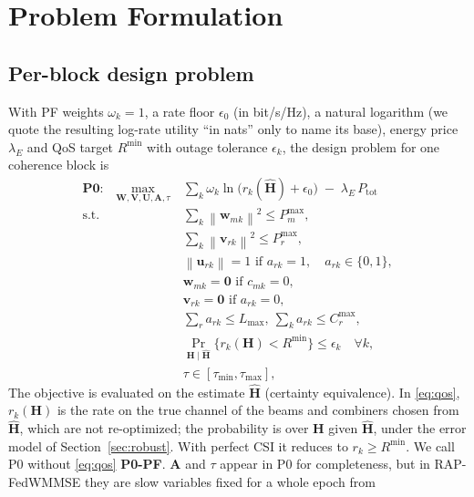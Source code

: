 \documentclass[conference]{IEEEtran}
\newcommand{\norm}[1]{\left\lVert #1 \right\rVert}
\begin{document}
\section{Problem Formulation}\label{sec:problem}
\subsection{Per-block design problem}
With PF weights $\omega_k=1$, a rate floor $\epsilon_0$ (in bit/s/Hz), a
natural logarithm (we quote the resulting log-rate utility ``in nats'' only
to name its base), energy price $\lambda_E$ and QoS target $R^{\min}$ with
outage tolerance $\epsilon_k$, the design problem for one coherence block is
\begin{subequations}\label{eq:P0}
\begin{align}
\textbf{P0:}\quad
\max_{\mathbf{W},\mathbf{V},\mathbf{U},\mathbf{A},\tau}\
& \sum_{k} \omega_k \ln\bigl(r_k(\hat{\mathbf{H}}) + \epsilon_0\bigr)
  \;-\; \lambda_E\, P_{\mathrm{tot}} \label{eq:obj}\\
\text{s.t.}\quad
& \textstyle\sum_k \norm{\mathbf{w}_{mk}}^2 \le P^{\max}_m, \\
& \textstyle\sum_k \norm{\mathbf{v}_{rk}}^2 \le P^{\max}_r, \\
& \norm{\mathbf{u}_{rk}} = 1 \text{ if } a_{rk}=1,
  \quad a_{rk}\in\{0,1\}, \\
& \mathbf{w}_{mk}=\mathbf{0} \text{ if } c_{mk}=0, \\
& \mathbf{v}_{rk}=\mathbf{0} \text{ if } a_{rk}=0, \\
& \textstyle\sum_r a_{rk} \le L_{\max},\ \textstyle\sum_k a_{rk} \le
  C_r^{\max}, \\
& \Pr_{\mathbf{H}\mid\hat{\mathbf{H}}}\{ r_k(\mathbf{H}) < R^{\min} \}
  \le \epsilon_k \quad \forall k, \label{eq:qos}\\
& \tau \in [\tau_{\min}, \tau_{\max}],
\end{align}
\end{subequations}
The objective is evaluated on the estimate $\hat{\mathbf{H}}$ (certainty
equivalence). In \eqref{eq:qos}, $r_k(\mathbf{H})$ is the rate on the true
channel of the beams and combiners chosen from $\hat{\mathbf{H}}$, which are
not re-optimized; the probability is over $\mathbf{H}$ given $\hat{\mathbf{H}}$,
under the error model of Section~\ref{sec:robust}. With perfect CSI it
reduces to $r_k\ge R^{\min}$. We call P0 without \eqref{eq:qos}
\textbf{P0-PF}. $\mathbf{A}$ and $\tau$ appear in P0 for completeness, but
in RAP-FedWMMSE they are slow variables fixed for a whole epoch from
\end{document}
